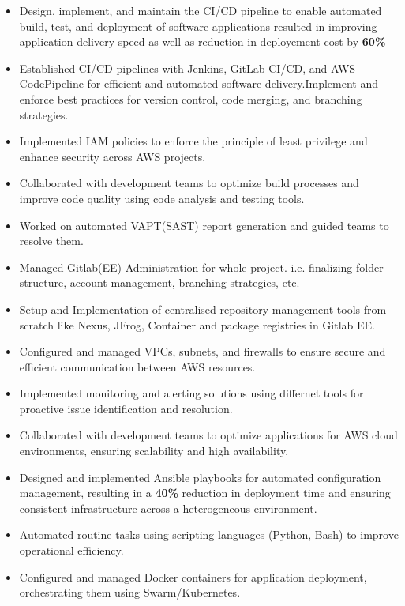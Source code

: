 \documentclass[a4paper]{article}
\begin{document}
\begin{itemize} \itemsep 1pt
    \item Design, implement, and maintain the CI/CD pipeline to enable automated build, test, and deployment of software applications resulted in improving application delivery speed as well as reduction in deployement cost by \textbf{60\%}
    \item Established CI/CD pipelines with Jenkins, GitLab CI/CD, and AWS CodePipeline for efficient and automated software delivery.Implement and enforce best practices for version control, code merging, and branching strategies.
    \item Implemented IAM policies to enforce the principle of least privilege and enhance security across AWS projects.
    \item Collaborated with development teams to optimize build processes and improve code quality using code analysis and testing tools.
    \item Worked on automated VAPT(SAST) report generation and guided teams to resolve them. 
    \item Managed Gitlab(EE) Administration for whole project. i.e. finalizing folder structure, account management, branching strategies, etc.
    \item Setup and Implementation of centralised repository management tools from scratch like Nexus, JFrog, Container and package registries in Gitlab EE.
    \item Configured and managed VPCs, subnets, and firewalls to ensure secure and efficient communication between AWS resources.
    \item Implemented monitoring and alerting solutions using differnet tools for proactive issue identification and resolution.
    \item Collaborated with development teams to optimize applications for AWS cloud environments, ensuring scalability and high availability.
    \item Designed and implemented Ansible playbooks for automated configuration management, resulting in a \textbf{40\%} reduction in deployment time and ensuring consistent infrastructure across a heterogeneous environment.
    \item Automated routine tasks using scripting languages (Python, Bash) to improve operational efficiency.
    \item Configured and managed Docker containers for application deployment, orchestrating them using Swarm/Kubernetes.
\end{itemize}
\end{document}
